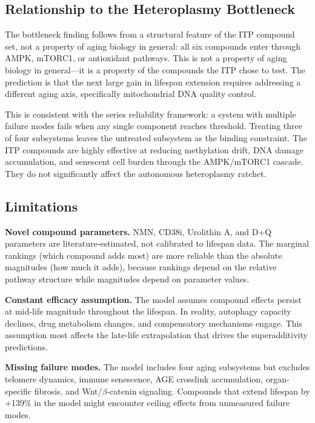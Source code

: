 \documentclass[11pt]{article}
\begin{document}
\subsection{Relationship to the Heteroplasmy Bottleneck}

The bottleneck finding follows from a structural feature of the ITP compound set, not a property of aging biology in general: all six compounds enter through AMPK, mTORC1, or antioxidant pathways. This is not a property of aging biology in general---it is a property of the compounds the ITP chose to test. The prediction is that the next large gain in lifespan extension requires addressing a different aging axis, specifically mitochondrial DNA quality control.

This is consistent with the series reliability framework: a system with multiple failure modes fails when any single component reaches threshold. Treating three of four subsystems leaves the untreated subsystem as the binding constraint. The ITP compounds are highly effective at reducing methylation drift, DNA damage accumulation, and senescent cell burden through the AMPK/mTORC1 cascade. They do not significantly affect the autonomous heteroplasmy ratchet.

\subsection{Limitations}

\textbf{Novel compound parameters.} NMN, CD38i, Urolithin A, and D+Q parameters are literature-estimated, not calibrated to lifespan data. The marginal rankings (which compound adds most) are more reliable than the absolute magnitudes (how much it adds), because rankings depend on the relative pathway structure while magnitudes depend on parameter values.

\textbf{Constant efficacy assumption.} The model assumes compound effects persist at mid-life magnitude throughout the lifespan. In reality, autophagy capacity declines, drug metabolism changes, and compensatory mechanisms engage. This assumption most affects the late-life extrapolation that drives the superadditivity predictions.

\textbf{Missing failure modes.} The model includes four aging subsystems but excludes telomere dynamics, immune senescence, AGE crosslink accumulation, organ-specific fibrosis, and Wnt/$\beta$-catenin signaling. Compounds that extend lifespan by +139\% in the model might encounter ceiling effects from unmeasured failure modes.
\end{document}
